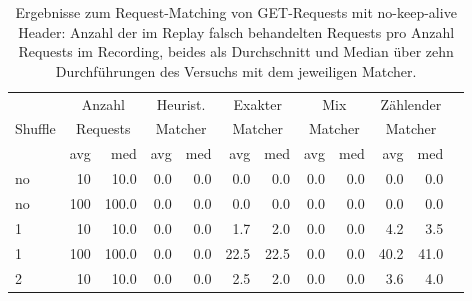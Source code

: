 \documentclass[12pt,a4paper]{report}
\begin{document}
\begin{table}[H]
	\centering
	\caption{
		Ergebnisse zum Request-Matching von GET-Requests mit no-keep-alive Header:
		Anzahl der im Replay falsch behandelten Requests pro Anzahl Requests im Recording,
		beides als Durchschnitt und Median über zehn Durchführungen des Versuchs mit dem jeweiligen Matcher.
	}
	\label{tab:get_nka}
	\begin{tabular}{|l|r|r|r|r|r|r|r|r|r|r|r|}
		\hline
		\multirow{3}{*}{Shuffle} & \multicolumn{2}{|c|}{Anzahl}   & \multicolumn{2}{|c|}{Heurist.} & \multicolumn{2}{|c|}{Exakter} & \multicolumn{2}{|c|}{Mix}     & \multicolumn{2}{|c|}{Zählender}                                  \\
		                         & \multicolumn{2}{|c|}{Requests} & \multicolumn{2}{|c|}{Matcher}  & \multicolumn{2}{|c|}{Matcher} & \multicolumn{2}{|c|}{Matcher} & \multicolumn{2}{|c|}{Matcher}                                    \\ \cline{2-11}
		                         & avg                            & med                            & avg                           & med                           & avg                             & med  & avg & med & avg  & med  \\ \hline
		no                       & 10                             & 10.0                           & 0.0                           & 0.0                           & 0.0                             & 0.0  & 0.0 & 0.0 & 0.0  & 0.0  \\ \hline
		no                       & 100                            & 100.0                          & 0.0                           & 0.0                           & 0.0                             & 0.0  & 0.0 & 0.0 & 0.0  & 0.0  \\ \hline
		1                        & 10                             & 10.0                           & 0.0                           & 0.0                           & 1.7                             & 2.0  & 0.0 & 0.0 & 4.2  & 3.5  \\ \hline
		1                        & 100                            & 100.0                          & 0.0                           & 0.0                           & 22.5                            & 22.5 & 0.0 & 0.0 & 40.2 & 41.0 \\ \hline
		2                        & 10                             & 10.0                           & 0.0                           & 0.0                           & 2.5                             & 2.0  & 0.0 & 0.0 & 3.6  & 4.0  \\ \hline

\end{tabular}
\end{table}
\end{document}
